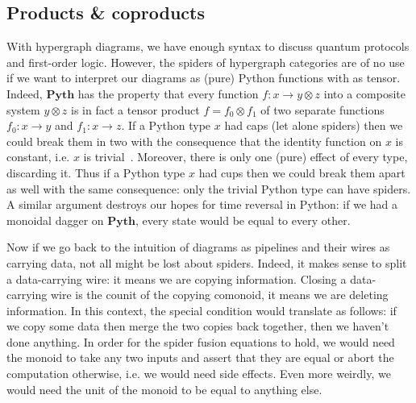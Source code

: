 
\subsection{Products \& coproducts} \label{subsection:cartesian}

With hypergraph diagrams, we have enough syntax to discuss quantum protocols and first-order logic.
However, the spiders of hypergraph categories are of no use if we want to interpret our diagrams as (pure) Python functions with  as tensor.
Indeed, $\mathbf{Pyth}$ has the property that every function $f : x \to y \otimes z$ into a composite system $y \otimes z$ is in fact a tensor product $f = f_0 \otimes f_1$ of two separate functions $f_0 : x \to y$ and $f_1 : x \to z$.
If a Python type $x$ had caps (let alone spiders) then we could break them in two with the consequence that the identity function on $x$ is constant, i.e. $x$ is trivial~\cite[Proposition~4.76]{CoeckeKissinger17}.
Moreover, there is only one (pure) effect of every type, discarding it.
Thus if a Python type $x$ had cups then we could break them apart as well with the same consequence: only the trivial Python type can have spiders.
A similar argument destroys our hopes for time reversal in Python: if we had a monoidal dagger on $\mathbf{Pyth}$, every state would be equal to every other.

Now if we go back to the intuition of diagrams as pipelines and their wires as carrying data, not all might be lost about spiders.
Indeed, it makes sense to split a data-carrying wire: it means we are copying information.
Closing a data-carrying wire is the counit of the copying comonoid, it means we are deleting information.
In this context, the special condition would translate as follows: if we copy some data then merge the two copies back together, then we haven't done anything.
In order for the spider fusion equations to hold, we would need the monoid to take any two inputs and assert that they are equal or abort the computation otherwise, i.e. we would need side effects.
Even more weirdly, we would need the unit of the monoid to be equal to anything else.

